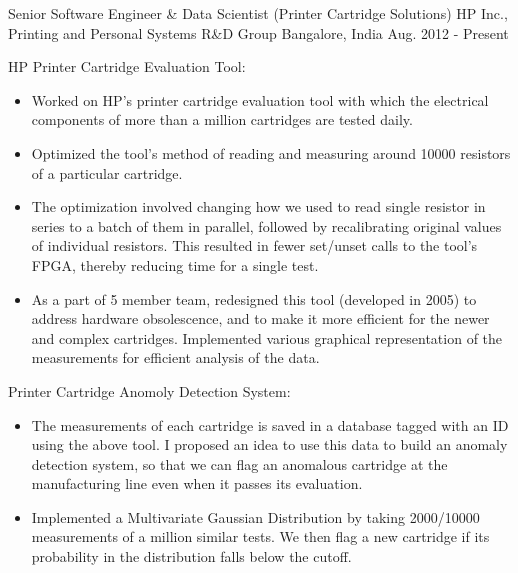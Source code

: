 \begin{cventries}
  \cvexp
    {Senior Software Engineer \& Data Scientist (Printer Cartridge Solutions)}
    {HP Inc., Printing and Personal Systems R\&D Group}
    {Bangalore, India}
    {Aug. 2012 - Present}
    {
      \begin{cvitems}
        \item 
        {
            \project
            {HP Printer Cartridge Evaluation Tool:}
            {\begin{itemize}[leftmargin=3ex, nosep, noitemsep]
            \setlength{\parskip}{2pt}
            \renewcommand{\labelitemii}{\textbullet}
                \item {Worked on HP's printer cartridge evaluation tool with which the electrical components of more than a million cartridges are tested daily.}
                \item {Optimized the tool's method of reading and measuring around 10000 resistors of a particular cartridge.} %
                \item {The optimization involved changing how we used to read single resistor in series to a batch of them in parallel, followed by recalibrating original values of individual resistors. This resulted in fewer set/unset calls to the tool's FPGA, thereby reducing time for a single test.}
                \item {As a part of 5 member team, redesigned this tool (developed in 2005) to address hardware obsolescence, and to make it more efficient for the newer and complex cartridges. Implemented various graphical representation of the measurements for efficient analysis of the data.}
            \end{itemize} 
            }
        }        
        \item 
        {
            \project
            {Printer Cartridge Anomoly Detection System:}
            {\begin{itemize}[leftmargin=3ex, nosep, noitemsep]
            \setlength{\parskip}{2pt}
            \renewcommand{\labelitemii}{\textbullet}
                \item {The measurements of each cartridge is saved in a database tagged with an ID using the above tool. I proposed an idea to use this data to build an anomaly detection system, so that we can flag an anomalous cartridge at the manufacturing line even when it passes its evaluation.}
                \item {Implemented a Multivariate Gaussian Distribution by taking 2000/10000 measurements of a million similar tests. We then flag a new cartridge if its probability in the distribution falls below the cutoff.}

\end{itemize}}}
\end{cvitems}}
\end{cventries}
